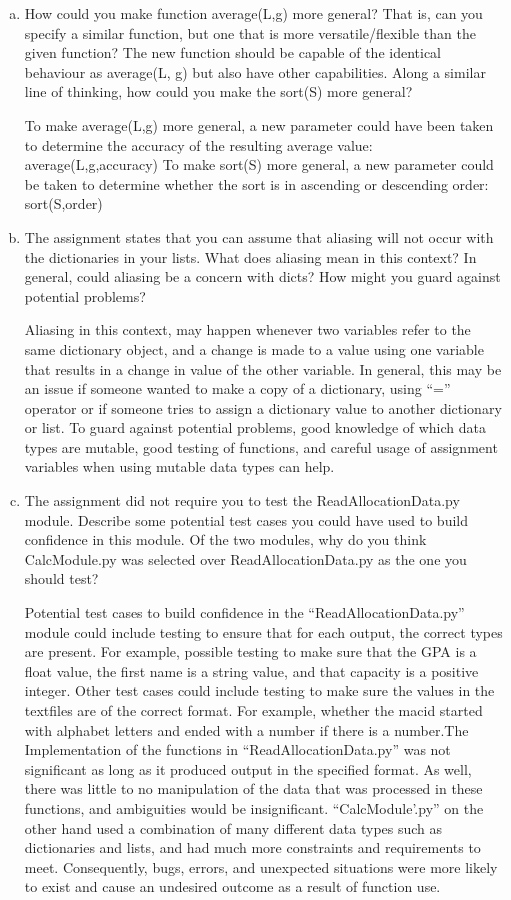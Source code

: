 \documentclass[12pt]{article}
\begin{document}
\begin{enumerate}[(a)]

\item How could you make function average(L,g) more general? That is, can you specify a similar function, but one that is more versatile/flexible than the given function? The new function should be capable of the identical behaviour as average(L, g) but also have other capabilities. Along a similar line of thinking, how could you make the sort(S) more general?

To make average(L,g) more general, a new parameter could have been taken to determine the accuracy of the resulting average value: average(L,g,accuracy)
To make sort(S) more general, a new parameter could be taken to determine whether the sort is in ascending or descending order: sort(S,order)

\item The assignment states that you can assume that aliasing will not occur with the dictionaries in your lists. What does aliasing mean in this context? In general, could aliasing be a concern with dicts? How might you guard against potential problems?

Aliasing in this context, may happen whenever two variables refer to the same dictionary object, and a change is made to a value using one variable that results in a change in value of the other variable. In general, this may be an issue if someone wanted to make a copy of a dictionary, using ``='' operator or if someone tries to assign a dictionary value to another dictionary or list. To guard against potential problems, good knowledge of which data types are mutable, good testing of functions, and careful usage of assignment variables when using mutable data types can help.

\item The assignment did not require you to test the ReadAllocationData.py module. Describe some potential test cases you could have used to build confidence in this module. Of the two modules, why do you think CalcModule.py was selected over ReadAllocationData.py as the one you should test?

Potential test cases to build confidence in the ``ReadAllocationData.py'' module could include testing to ensure that for each output, the correct types are present. For example, possible testing to make sure that the GPA is a float value, the first name is a string value, and that capacity is a positive integer. Other test cases could include testing to make sure the values in the textfiles are of the correct format. For example, whether the macid started with alphabet letters and ended with a number if there is a number.The Implementation of the functions in ``ReadAllocationData.py'' was not significant as long as it produced output in the specified format. As well, there was little to no manipulation of the data that was processed in these functions, and ambiguities would be insignificant. ``CalcModule'.py'' on the other hand used a combination of many different data types such as dictionaries and lists, and had much more constraints and requirements to meet. Consequently, bugs, errors, and unexpected situations were more likely to exist and cause an undesired outcome as a result of function use.


\end{enumerate}
\end{document}
